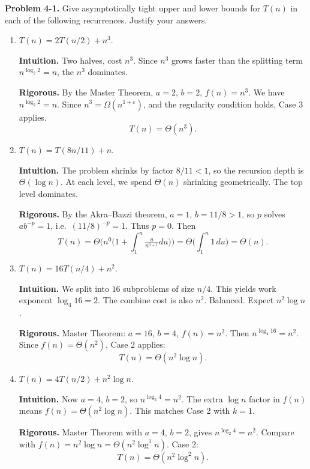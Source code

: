 \documentclass[12pt]{article}
\theoremstyle{definition}
\begin{document}
\noindent\textbf{Problem 4-1.}
Give asymptotically tight upper and lower bounds for $T(n)$ in each of the following recurrences. Justify your answers.

\begin{enumerate}
\item $T(n)=2T(n/2)+n^3$.

\textbf{Intuition.}  
Two halves, cost $n^3$. Since $n^3$ grows faster than the splitting term $n^{\log_2 2}=n$, the $n^3$ dominates.  

\textbf{Rigorous.}  
By the Master Theorem, $a=2$, $b=2$, $f(n)=n^3$. We have $n^{\log_2 2}=n$. Since $n^3=\Omega(n^{1+\varepsilon})$, and the regularity condition holds, Case 3 applies.  
\[
T(n)=\Theta(n^3).
\]

\item $T(n)=T(8n/11)+n$.

\textbf{Intuition.}  
The problem shrinks by factor $8/11<1$, so the recursion depth is $\Theta(\log n)$. At each level, we spend $\Theta(n)$ shrinking geometrically. The top level dominates.  

\textbf{Rigorous.}  
By the Akra–Bazzi theorem, $a=1$, $b=11/8>1$, so $p$ solves $a b^{-p}=1$, i.e.\ $(11/8)^{-p}=1$. Thus $p=0$. Then
\[
T(n)=\Theta\!\Big(n^0\Big(1+\int_1^n \tfrac{u}{u^{0+1}}du\Big)\Big)=\Theta\!\Big(\int_1^n 1\,du\Big)=\Theta(n).
\]

\item $T(n)=16T(n/4)+n^2$.

\textbf{Intuition.}  
We split into $16$ subproblems of size $n/4$. This yields work exponent $\log_4 16=2$. The combine cost is also $n^2$. Balanced. Expect $n^2\log n$.  

\textbf{Rigorous.}  
Master Theorem: $a=16$, $b=4$, $f(n)=n^2$. Then $n^{\log_4 16}=n^2$. Since $f(n)=\Theta(n^2)$, Case 2 applies:  
\[
T(n)=\Theta(n^2\log n).
\]

\item $T(n)=4T(n/2)+n^2\log n$.

\textbf{Intuition.}  
Now $a=4$, $b=2$, so $n^{\log_2 4}=n^2$. The extra $\log n$ factor in $f(n)$ means $f(n)=\Theta(n^2\log n)$. This matches Case 2 with $k=1$.  

\textbf{Rigorous.}  
Master Theorem with $a=4$, $b=2$, gives $n^{\log_2 4}=n^2$. Compare with $f(n)=n^2\log n=\Theta(n^2\log^1 n)$. Case 2:  
\[
T(n)=\Theta(n^2\log^2 n).
\]


\end{enumerate}
\end{document}
